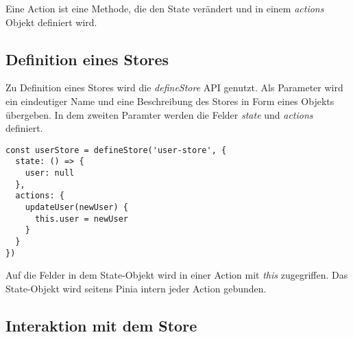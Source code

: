 Eine Action ist eine Methode, die den State verändert und in einem \textit{actions} Objekt definiert wird.

\subsection{Definition eines Stores}

Zu Definition eines Stores wird die \textit{defineStore} API genutzt. Als Parameter wird ein eindeutiger Name und eine Beschreibung des Stores in Form eines Objekts übergeben. In dem zweiten Paramter werden die Felder \textit{state} und \textit{actions} definiert.

\begin{lstlisting}
const userStore = defineStore('user-store', {
  state: () => {
    user: null
  },
  actions: {
    updateUser(newUser) {
      this.user = newUser
    }
  }
})
\end{lstlisting}

Auf die Felder in dem State-Objekt wird in einer Action mit \textit{this} zugegriffen. Das State-Objekt wird seitens Pinia intern jeder Action gebunden.

\subsection{Interaktion mit dem Store}

